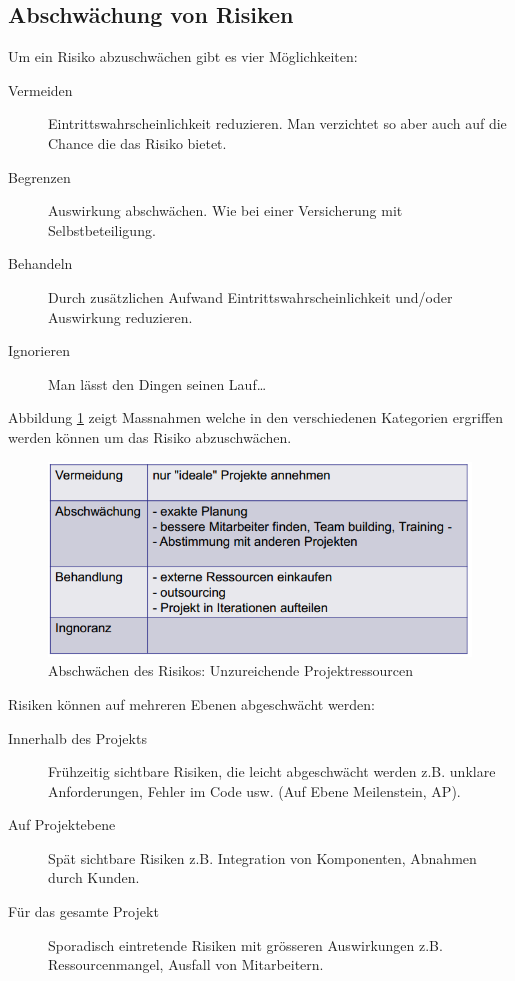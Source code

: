 \subsection{Abschwächung von Risiken}

Um ein Risiko abzuschwächen gibt es vier Möglichkeiten:
\begin{description}
	\item[Vermeiden] Eintrittswahrscheinlichkeit reduzieren. Man verzichtet so aber auch auf die Chance die das Risiko bietet.
	\item[Begrenzen] Auswirkung abschwächen. Wie bei einer Versicherung mit Selbstbeteiligung.
	\item[Behandeln] Durch zusätzlichen Aufwand Eintrittswahrscheinlichkeit und/oder Auswirkung reduzieren.
	\item[Ignorieren] Man lässt den Dingen seinen Lauf\dots
\end{description}
Abbildung \ref{fig:risiko-management-beispiel-abschwaechen-risiko} zeigt Massnahmen welche in den verschiedenen Kategorien ergriffen werden können um das Risiko abzuschwächen.
\begin{figure}[h!]
\centering
\includegraphics[width=0.7\linewidth]{fig/risiko-management-beispiel-abschwaechen-risiko}
\caption{Abschwächen des Risikos: Unzureichende Projektressourcen}
\label{fig:risiko-management-beispiel-abschwaechen-risiko}
\end{figure}
Risiken können auf mehreren Ebenen abgeschwächt werden:
\begin{description}
	\item[Innerhalb des Projekts] Frühzeitig sichtbare Risiken, die leicht abgeschwächt werden z.B. unklare Anforderungen, Fehler im Code usw. (Auf Ebene Meilenstein, AP).
	\item[Auf Projektebene] Spät sichtbare Risiken z.B. Integration von Komponenten, Abnahmen durch Kunden.
	\item[Für das gesamte Projekt] Sporadisch eintretende Risiken mit grösseren Auswirkungen z.B. Ressourcenmangel, Ausfall von Mitarbeitern.
\end{description}

